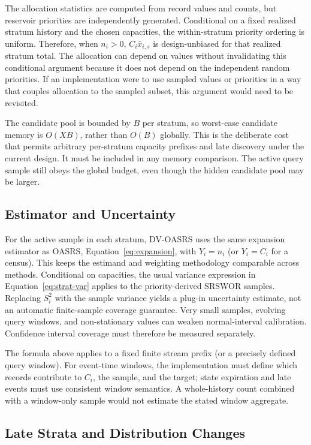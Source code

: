 \documentclass[11pt]{article}
\begin{document}
The allocation statistics are computed from record values and counts, but reservoir priorities are independently generated. Conditional on a fixed realized stratum history and the chosen capacities, the within-stratum priority ordering is uniform. Therefore, when $n_i>0$, $C_i\bar{x}_{i,s}$ is design-unbiased for that realized stratum total. The allocation can depend on values without invalidating this conditional argument because it does not depend on the independent random priorities. If an implementation were to use sampled values or priorities in a way that couples allocation to the sampled subset, this argument would need to be revisited.

The candidate pool is bounded by $B$ per stratum, so worst-case candidate memory is $O(XB)$, rather than $O(B)$ globally. This is the deliberate cost that permits arbitrary per-stratum capacity prefixes and late discovery under the current design. It must be included in any memory comparison. The active query sample still obeys the global budget, even though the hidden candidate pool may be larger.

\subsection{Estimator and Uncertainty}

For the active sample in each stratum, DV-OASRS uses the same expansion estimator as OASRS, Equation~\ref{eq:expansion}, with $Y_i=n_i$ (or $Y_i=C_i$ for a census). This keeps the estimand and weighting methodology comparable across methods. Conditional on capacities, the usual variance expression in Equation~\ref{eq:strat-var} applies to the priority-derived SRSWOR samples. Replacing $S_i^2$ with the sample variance yields a plug-in uncertainty estimate, not an automatic finite-sample coverage guarantee. Very small samples, evolving query windows, and non-stationary values can weaken normal-interval calibration. Confidence interval coverage must therefore be measured separately.

The formula above applies to a fixed finite stream prefix (or a precisely defined query window). For event-time windows, the implementation must define which records contribute to $C_i$, the sample, and the target; state expiration and late events must use consistent window semantics. A whole-history count combined with a window-only sample would not estimate the stated window aggregate.

\subsection{Late Strata and Distribution Changes}
\end{document}
